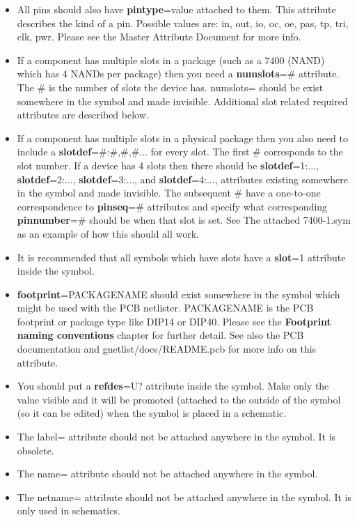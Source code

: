 \documentclass{article}
\begin{document}
\begin{itemize}
\item All pins should also have {\bf pintype}=value attached to them.
      This attribute describes the kind of a pin.  Possible values are:
      in, out, io, oc, oe, pas, tp, tri, clk, pwr.  Please see the Master
      Attribute Document for more info.

\item If a component has multiple slots in a package (such as
      a 7400 (NAND) which has 4 NANDs per package) then you need a
      {\bf numslots}=\# attribute.  The \# is the number of
      slots the device has.  numslots= should be exist somewhere in
      the symbol and made invisible.  Additional slot related required
      attributes are described below.

\item If a component has multiple slots in a physical package then you
      also need to include a {\bf slotdef}=\#:\#,\#,\#...
      for every slot.  The first \# corresponds to the slot number.
      If a device has 4 slots then there should be {\bf slotdef}=1:...,
      {\bf slotdef}=2:..., {\bf slotdef}=3:..., and {\bf slotdef}=4:...,
      attributes existing somewhere in the symbol and made invisible.
      The subsequent \# have a one-to-one correspondence to {\bf pinseq}=\#
      attributes and specify what corresponding {\bf pinnumber}=\#
      should be when that slot is set.  See The attached 7400-1.sym as
      an example of how this should all work.

\item It is recommended that all symbols which have slots have a {\bf
      slot}=1 attribute inside the symbol.

\item {\bf footprint}=PACKAGENAME should exist somewhere in the symbol
      which might be used with the PCB netlister.  PACKAGENAME is the
      PCB footprint or package type like DIP14 or DIP40.  Please see
      the {\bf Footprint naming conventions} chapter for further detail. 
      See also the PCB documentation and gnetlist/docs/README.pcb for 
      more info on this attribute.

\item You should put a {\bf refdes}=U? attribute inside the symbol.
      Make only the value visible and it will be promoted (attached to
      the outside of the symbol (so it can be edited) when the symbol
      is placed in a schematic.

\item The label= attribute should not be attached anywhere in
      the symbol.  It is obsolete.  

\item The name= attribute should not be attached anywhere in the symbol.

\item The netname= attribute should not be attached anywhere in the
      symbol.  It is only used in schematics.

\end{itemize}
\end{document}
